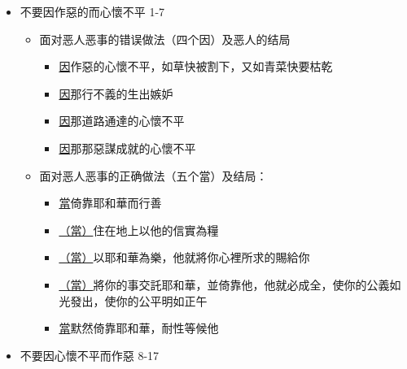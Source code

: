 \begin{itemize}
\itemsep-.45em 
\item 不要因作惡的而心懷不平 1-7
\begin{itemize}
\itemsep-.45em 
\item 面对恶人恶事的错误做法（四个因）及恶人的结局
\begin{itemize}
\itemsep-.45em 
\item \underline{因}作惡的心懷不平，如草快被割下，又如青菜快要枯乾
\item \underline{因}那行不義的生出嫉妒	
\item \underline{因}那道路通達的心懷不平	
\item \underline{因}那那惡謀成就的心懷不平	
\end{itemize}
\item 面对恶人恶事的正确做法（五个當）及结局：
\begin{itemize}
\itemsep-.45em 
\item \underline{當}倚靠耶和華而行善	
\item \underline{（當）}住在地上以他的信實為糧	
\item \underline{（當）}以耶和華為樂，他就將你心裡所求的賜給你
\item \underline{（當）}將你的事交託耶和華，並倚靠他，他就必成全，使你的公義如光發出，使你的公平明如正午
\item \underline{當}默然倚靠耶和華，耐性等候他	
\end{itemize}
\end{itemize}
\item 不要因心懷不平而作惡 8-17
\end{itemize}

